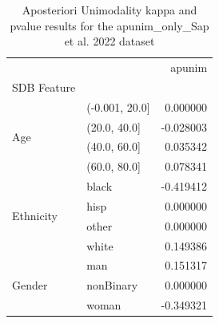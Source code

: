 \begin{table}
\caption{Aposteriori Unimodality kappa and pvalue results for the apunim_only_Sap et al. 2022 dataset}
\label{tab:results_apunim_only_sap}
\begin{tabular}{llr}
\toprule
 &  & apunim \\
SDB Feature &  &  \\
\midrule
\multirow[t]{4}{*}{Age} & (-0.001, 20.0] & 0.000000 \\
 & (20.0, 40.0] & -0.028003 \\
 & (40.0, 60.0] & 0.035342 \\
 & (60.0, 80.0] & 0.078341 \\
\cline{1-3}
\multirow[t]{4}{*}{Ethnicity} & black & -0.419412 \\
 & hisp & 0.000000 \\
 & other & 0.000000 \\
 & white & 0.149386 \\
\cline{1-3}
\multirow[t]{3}{*}{Gender} & man & 0.151317 \\
 & nonBinary & 0.000000 \\
 & woman & -0.349321 \\
\cline{1-3}
\bottomrule
\end{tabular}
\end{table}
